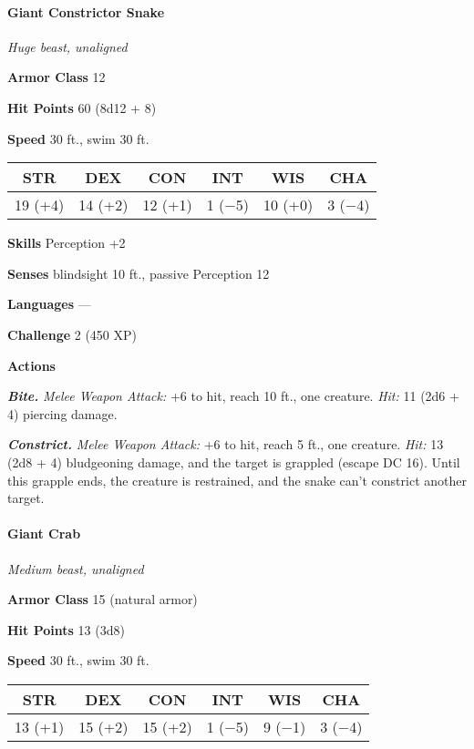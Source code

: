 \documentclass[
]{article}
\begin{document}
\hypertarget{giant-constrictor-snake}{%
\paragraph{Giant Constrictor Snake}\label{giant-constrictor-snake}}

\emph{Huge beast, unaligned}

\textbf{Armor Class} 12

\textbf{Hit Points} 60 (8d12 + 8)

\textbf{Speed} 30 ft., swim 30 ft.

\begin{longtable}[]{@{}cccccc@{}}
\toprule
STR & DEX & CON & INT & WIS & CHA\tabularnewline
\midrule
\endhead
19 (+4) & 14 (+2) & 12 (+1) & 1 (−5) & 10 (+0) & 3 (−4)\tabularnewline
\bottomrule
\end{longtable}

\textbf{Skills} Perception +2

\textbf{Senses} blindsight 10 ft., passive Perception 12

\textbf{Languages} ---

\textbf{Challenge} 2 (450 XP)

\textbf{Actions}

\emph{\textbf{Bite.}} \emph{Melee Weapon Attack:} +6 to hit, reach 10
ft., one creature. \emph{Hit:} 11 (2d6 + 4) piercing damage.

\emph{\textbf{Constrict.}} \emph{Melee Weapon Attack:} +6 to hit, reach
5 ft., one creature. \emph{Hit:} 13 (2d8 + 4) bludgeoning damage, and
the target is grappled (escape DC 16). Until this grapple ends, the
creature is restrained, and the snake can't constrict another target.

\hypertarget{giant-crab}{%
\paragraph{Giant Crab}\label{giant-crab}}

\emph{Medium beast, unaligned}

\textbf{Armor Class} 15 (natural armor)

\textbf{Hit Points} 13 (3d8)

\textbf{Speed} 30 ft., swim 30 ft.

\begin{longtable}[]{@{}cccccc@{}}
\toprule
STR & DEX & CON & INT & WIS & CHA\tabularnewline
\midrule
\endhead
13 (+1) & 15 (+2) & 15 (+2) & 1 (−5) & 9 (−1) & 3 (−4)\tabularnewline
\bottomrule
\end{longtable}
\end{document}
